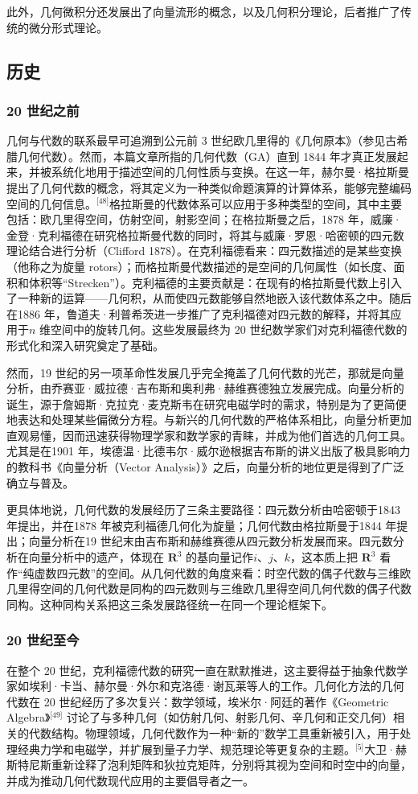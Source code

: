 此外，几何微积分还发展出了向量流形的概念，以及几何积分理论，后者推广了传统的微分形式理论。
\subsection{历史}
\subsubsection{20 世纪之前}
几何与代数的联系最早可追溯到公元前 3 世纪欧几里得的《几何原本》（参见古希腊几何代数）。然而，本篇文章所指的几何代数（GA）直到 1844 年才真正发展起来，并被系统化地用于描述空间的几何性质与变换。在这一年，赫尔曼·格拉斯曼提出了几何代数的概念，将其定义为一种类似命题演算的计算体系，能够完整编码空间的几何信息。\(^\text{[48]}\)格拉斯曼的代数体系可以应用于多种类型的空间，其中主要包括：欧几里得空间，仿射空间，射影空间；在格拉斯曼之后，1878 年，威廉·金登·克利福德在研究格拉斯曼代数的同时，将其与威廉·罗恩·哈密顿的四元数理论结合进行分析（Clifford 1878）。在克利福德看来：四元数描述的是某些变换（他称之为旋量 rotors）；而格拉斯曼代数描述的是空间的几何属性（如长度、面积和体积等“Strecken”）。克利福德的主要贡献是：在现有的格拉斯曼代数上引入了一种新的运算——几何积，从而使四元数能够自然地嵌入该代数体系之中。随后在1886 年，鲁道夫·利普希茨进一步推广了克利福德对四元数的解释，并将其应用于$n$ 维空间中的旋转几何。这些发展最终为 20 世纪数学家们对克利福德代数的形式化和深入研究奠定了基础。

然而，19 世纪的另一项革命性发展几乎完全掩盖了几何代数的光芒，那就是向量分析，由乔赛亚·威拉德·吉布斯和奥利弗·赫维赛德独立发展完成。向量分析的诞生，源于詹姆斯·克拉克·麦克斯韦在研究电磁学时的需求，特别是为了更简便地表达和处理某些偏微分方程。与新兴的几何代数的严格体系相比，向量分析更加直观易懂，因而迅速获得物理学家和数学家的青睐，并成为他们首选的几何工具。尤其是在1901 年，埃德温·比德韦尔·威尔逊根据吉布斯的讲义出版了极具影响力的教科书《向量分析（Vector Analysis）》之后，向量分析的地位更是得到了广泛确立与普及。

更具体地说，几何代数的发展经历了三条主要路径：四元数分析由哈密顿于1843 年提出，并在1878 年被克利福德几何化为旋量；几何代数由格拉斯曼于1844 年提出；向量分析在19 世纪末由吉布斯和赫维赛德从四元数分析发展而来。四元数分析在向量分析中的遗产，体现在 $\mathbf{R}^3$ 的基向量记作$i$、$j$、$k$，这本质上把 $\mathbf{R}^3$ 看作“纯虚数四元数”的空间。从几何代数的角度来看：时空代数的偶子代数与三维欧几里得空间的几何代数是同构的四元数则与三维欧几里得空间几何代数的偶子代数同构。这种同构关系把这三条发展路径统一在同一个理论框架下。
\subsubsection{20 世纪至今}
在整个 20 世纪，克利福德代数的研究一直在默默推进，这主要得益于抽象代数学家如埃利·卡当、赫尔曼·外尔和克洛德·谢瓦莱等人的工作。几何化方法的几何代数在 20 世纪经历了多次复兴：数学领域，埃米尔·阿廷的著作《Geometric Algebra》\(^\text{[49]}\) 讨论了与多种几何（如仿射几何、射影几何、辛几何和正交几何）相关的代数结构。物理领域，几何代数作为一种“新的”数学工具重新被引入，用于处理经典力学和电磁学，并扩展到量子力学、规范理论等更复杂的主题。\(^\text{[5]}\)大卫·赫斯特尼斯重新诠释了泡利矩阵和狄拉克矩阵，分别将其视为空间和时空中的向量，并成为推动几何代数现代应用的主要倡导者之一。

